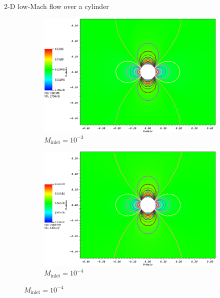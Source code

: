 \documentclass[xcolor=dvipsnames,10pt]{beamer}
\begin{document}
\begin{frame}{$2$-D low-Mach flow over a cylinder}
\begin{figure}
        \begin{subfigure}[b]{0.37\textwidth}
                \centering
                \includegraphics[width=\textwidth]{../figures/CylinderMach1em3ZoomIn.png}
                \caption{$M_{\text{inlet}}=10^{-3}$}
        \end{subfigure}%
        \begin{subfigure}[b]{0.37\textwidth}
                \centering
                \includegraphics[width=\textwidth]{../figures/CylinderMach1em4ZoomIn.png}
                \caption{$M_{\text{inlet}}=10^{-4}$}
        \end{subfigure}    
  

\end{figure}
\end{frame}
\end{document}
